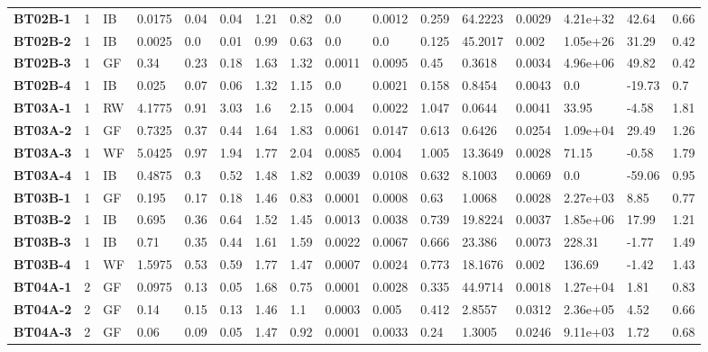\begin{table}
{\begin{tabular}{l|c|l|l|l|l|l|l|l|l|l|l|l|l|l|l}
    \hline
    \bfseries BT02B-1 & 1 & IB & 0.0175 & 0.04 & 0.04 & 1.21 & 0.82 & 0.0 & 0.0012 & 0.259 & 64.2223 & 0.0029 & 4.21e+32 & 42.64 & 0.66 \\
    \bfseries BT02B-2 & 1 & IB & 0.0025 & 0.0 & 0.01 & 0.99 & 0.63 & 0.0 & 0.0 & 0.125 & 45.2017 & 0.002 & 1.05e+26 & 31.29 & 0.42 \\
    \bfseries BT02B-3 & 1 & GF & 0.34 & 0.23 & 0.18 & 1.63 & 1.32 & 0.0011 & 0.0095 & 0.45 & 0.3618 & 0.0034 & 4.96e+06 & 49.82 & 0.42 \\
    \bfseries BT02B-4 & 1 & IB & 0.025 & 0.07 & 0.06 & 1.32 & 1.15 & 0.0 & 0.0021 & 0.158 & 0.8454 & 0.0043 & 0.0 & -19.73 & 0.7 \\
    \hline
    \bfseries BT03A-1 & 1 & RW & 4.1775 & 0.91 & 3.03 & 1.6 & 2.15 & 0.004 & 0.0022 & 1.047 & 0.0644 & 0.0041 & 33.95 & -4.58 & 1.81 \\
    \bfseries BT03A-2 & 1 & GF & 0.7325 & 0.37 & 0.44 & 1.64 & 1.83 & 0.0061 & 0.0147 & 0.613 & 0.6426 & 0.0254 & 1.09e+04 & 29.49 & 1.26 \\
    \bfseries BT03A-3 & 1 & WF & 5.0425 & 0.97 & 1.94 & 1.77 & 2.04 & 0.0085 & 0.004 & 1.005 & 13.3649 & 0.0028 & 71.15 & -0.58 & 1.79 \\
    \bfseries BT03A-4 & 1 & IB & 0.4875 & 0.3 & 0.52 & 1.48 & 1.82 & 0.0039 & 0.0108 & 0.632 & 8.1003 & 0.0069 & 0.0 & -59.06 & 0.95 \\
    \hline
    \bfseries BT03B-1 & 1 & GF & 0.195 & 0.17 & 0.18 & 1.46 & 0.83 & 0.0001 & 0.0008 & 0.63 & 1.0068 & 0.0028 & 2.27e+03 & 8.85 & 0.77 \\
    \bfseries BT03B-2 & 1 & IB & 0.695 & 0.36 & 0.64 & 1.52 & 1.45 & 0.0013 & 0.0038 & 0.739 & 19.8224 & 0.0037 & 1.85e+06 & 17.99 & 1.21 \\
    \bfseries BT03B-3 & 1 & IB & 0.71 & 0.35 & 0.44 & 1.61 & 1.59 & 0.0022 & 0.0067 & 0.666 & 23.386 & 0.0073 & 228.31 & -1.77 & 1.49 \\
    \bfseries BT03B-4 & 1 & WF & 1.5975 & 0.53 & 0.59 & 1.77 & 1.47 & 0.0007 & 0.0024 & 0.773 & 18.1676 & 0.002 & 136.69 & -1.42 & 1.43 \\
    \hline
    \bfseries BT04A-1 & 2 & GF & 0.0975 & 0.13 & 0.05 & 1.68 & 0.75 & 0.0001 & 0.0028 & 0.335 & 44.9714 & 0.0018 & 1.27e+04 & 1.81 & 0.83 \\
    \bfseries BT04A-2 & 2 & GF & 0.14 & 0.15 & 0.13 & 1.46 & 1.1 & 0.0003 & 0.005 & 0.412 & 2.8557 & 0.0312 & 2.36e+05 & 4.52 & 0.66 \\
    \bfseries BT04A-3 & 2 & GF & 0.06 & 0.09 & 0.05 & 1.47 & 0.92 & 0.0001 & 0.0033 & 0.24 & 1.3005 & 0.0246 & 9.11e+03 & 1.72 & 0.68 \\

\end{tabular}}
\end{table}

